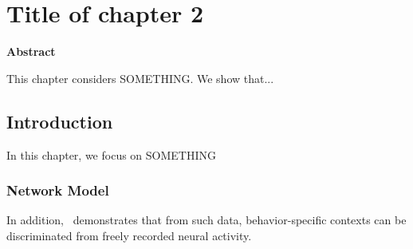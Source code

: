 
\chapter{Title of chapter 2}


  \begin{center}
  \textbf{\LARGE Abstract}
  \end{center}

  This chapter considers SOMETHING.
  We show that...

\clearpage

\section{Introduction} 

In this chapter, we focus on SOMETHING

\subsection{Network Model}\label{comm-ssec:model}


In addition,~\cite{alasfour2018coarse} demonstrates that from such data, behavior-specific contexts can be discriminated from freely recorded neural activity.

